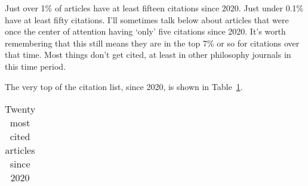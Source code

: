 \documentclass[
  10pt,
  letterpaper,
  DIV=11,
  numbers=noendperiod,
  twoside]{scrartcl}
\begin{document}
Just over 1\% of articles have at least fifteen citations since 2020.
Just under 0.1\% have at least fifty citations. I'll sometimes talk
below about articles that were once the center of attention having
`only' five citations since 2020. It's worth remembering that this still
means they are in the top 7\% or so for citations over that time. Most
things don't get cited, at least in other philosophy journals in this
time period.

The very top of the citation list, since 2020, is shown in
Table~\ref{tbl-recent-high-cite}.


\begin{longtable}[]{@{}
  >{\raggedleft\arraybackslash}p{}
  >{\raggedright\arraybackslash}p{}@{}}

\caption{\label{tbl-recent-high-cite}Twenty most cited articles since
2020}

\tabularnewline


\end{longtable}
\end{document}
